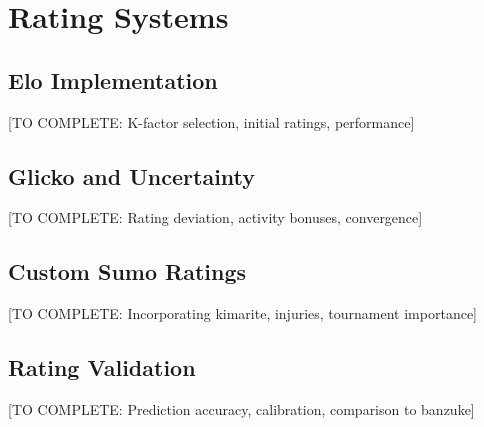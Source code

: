\section{Rating Systems}

\subsection{Elo Implementation}

[TO COMPLETE: K-factor selection, initial ratings, performance]

\subsection{Glicko and Uncertainty}

[TO COMPLETE: Rating deviation, activity bonuses, convergence]

\subsection{Custom Sumo Ratings}

[TO COMPLETE: Incorporating kimarite, injuries, tournament importance]

\subsection{Rating Validation}

[TO COMPLETE: Prediction accuracy, calibration, comparison to banzuke]